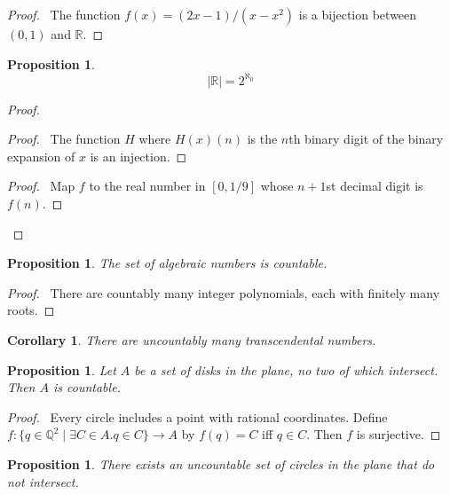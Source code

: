 \documentclass{book}
\let\qed\relax
\newtheorem{prop}[ax]{Proposition}
\newtheorem{cor}{Corollary}[ax]
\theoremstyle{definition}
\begin{document}
\begin{proof}
\pf\ The function $f(x) = (2x-1)/(x-x^2)$ is a bijection between $(0,1)$ and $\mathbb{R}$. \qed
\end{proof}

\begin{prop}
\[ |\mathbb{R}| = 2^{\aleph_0} \]
\end{prop}

\begin{proof}
\pf
{}
\begin{proof}
	\pf\ The function $H$ where $H(x)(n)$ is the $n$th binary digit of the binary expansion of $x$ is an injection.
\end{proof}
\begin{proof}
	\pf\ Map $f$ to the real number in $[0, 1/9]$ whose $n+1$st decimal digit is $f(n)$.
\end{proof}
\qed
\end{proof}

\begin{prop}
The set of algebraic numbers is countable.
\end{prop}

\begin{proof}
\pf\ There are countably many integer polynomials, each with finitely many roots. \qed
\end{proof}

\begin{cor}
There are uncountably many transcendental numbers.
\end{cor}

\begin{prop}
Let $A$ be a set of disks in the plane, no two of which intersect. Then $A$ is countable.
\end{prop}

\begin{proof}
\pf\ Every circle includes a point with rational coordinates. Define $f : \{ q \in \mathbb{Q}^2 \mid \exists C \in A. q \in C \} \rightarrow A$ by $f(q) = C$ iff $q \in C$. Then $f$ is surjective. \qed
\end{proof}

\begin{prop}
There exists an uncountable set of circles in the plane that do not intersect.
\end{prop}
\end{document}
